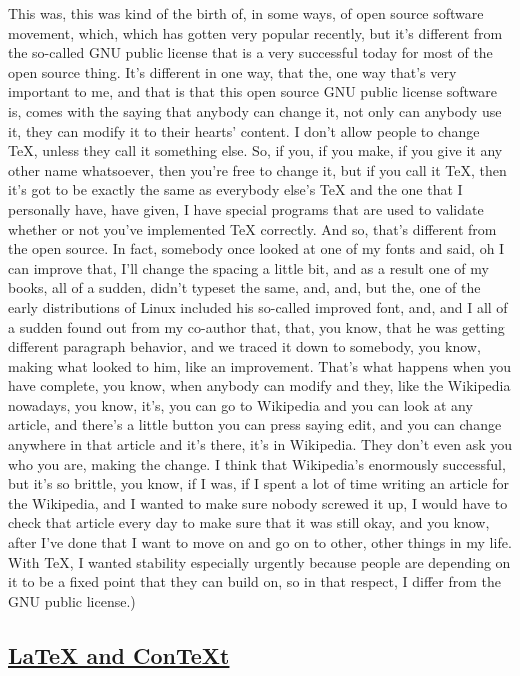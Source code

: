 \documentclass[]{article}
\begin{document}
This was, this was kind of the birth of, in some ways, of open source
software movement, which, which has gotten very popular recently, but
it's different from the so-called GNU public license that is a very
successful today for most of the open source thing. It's different in
one way, that the, one way that's very important to me, and that is that
this open source GNU public license software is, comes with the saying
that anybody can change it, not only can anybody use it, they can modify
it to their hearts' content. I don't allow people to change TeX, unless
they call it something else. So, if you, if you make, if you give it any
other name whatsoever, then you're free to change it, but if you call it
TeX, then it's got to be exactly the same as everybody else's TeX and
the one that I personally have, have given, I have special programs that
are used to validate whether or not you've implemented TeX correctly.
And so, that's different from the open source. In fact, somebody once
looked at one of my fonts and said, oh I can improve that, I'll change
the spacing a little bit, and as a result one of my books, all of a
sudden, didn't typeset the same, and, and, but the, one of the early
distributions of Linux included his so-called improved font, and, and I
all of a sudden found out from my co-author that, that, you know, that
he was getting different paragraph behavior, and we traced it down to
somebody, you know, making what looked to him, like an improvement.
That's what happens when you have complete, you know, when anybody can
modify and they, like the Wikipedia nowadays, you know, it's, you can go
to Wikipedia and you can look at any article, and there's a little
button you can press saying edit, and you can change anywhere in that
article and it's there, it's in Wikipedia. They don't even ask you who
you are, making the change. I think that Wikipedia's enormously
successful, but it's so brittle, you know, if I was, if I spent a lot of
time writing an article for the Wikipedia, and I wanted to make sure
nobody screwed it up, I would have to check that article every day to
make sure that it was still okay, and you know, after I've done that I
want to move on and go on to other, other things in my life. With TeX, I
wanted stability especially urgently because people are depending on it
to be a fixed point that they can build on, so in that respect, I differ
from the GNU public license.)

\subsection{\texorpdfstring{\href{http://webofstories.com/play/17128}{LaTeX
and ConTeXt}}{LaTeX and ConTeXt}}\label{latex-and-context}
\end{document}
